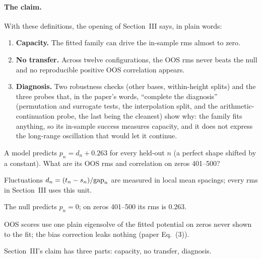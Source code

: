 \paragraph{The claim.} With these definitions, the opening of Section~III says, in plain words:
\begin{enumerate}
\item \textbf{Capacity.} The fitted family can drive the in-sample rms almost to zero.
\item \textbf{No transfer.} Across twelve configurations, the OOS rms never beats the null and no reproducible positive OOS correlation appears.
\item \textbf{Diagnosis.} Two robustness checks (other bases, within-height splits) and the three probes that, in the paper's words, ``complete the diagnosis'' (permutation and surrogate tests, the interpolation split, and the arithmetic-continuation probe, the last being the cleanest) show why: the family fits anything, so its in-sample success measures capacity, and it does not express the long-range oscillation that would let it continue.
\end{enumerate}

\begin{checkpoint}
A model predicts $p_n=d_n+0.263$ for every held-out $n$ (a perfect shape shifted by a constant). What are its OOS rms and correlation on zeros 401--500?
\end{checkpoint}

\begin{keyideas}
\item Fluctuations $d_n=(t_n-s_n)/\mathrm{gap}_n$ are measured in local mean spacings; every rms in Section~III uses this unit.
\item The null predicts $p_n=0$; on zeros 401--500 its rms is 0.263.
\item OOS scores use one plain eigensolve of the fitted potential on zeros never shown to the fit; the bias correction leaks nothing (paper Eq.~(3)).
\item Section~III's claim has three parts: capacity, no transfer, diagnosis.
\end{keyideas}

